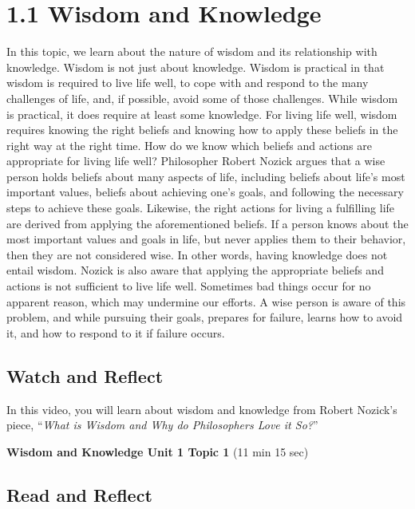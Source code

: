 \documentclass[
]{book}
\begin{document}
\hypertarget{wisdom-and-knowledge}{%
\section*{1.1 Wisdom and Knowledge}\label{wisdom-and-knowledge}}

In this topic, we learn about the nature of wisdom and its relationship with knowledge. Wisdom is not just about knowledge. Wisdom is practical in that wisdom is required to live life well, to cope with and respond to the many challenges of life, and, if possible, avoid some of those challenges. While wisdom is practical, it does require at least some knowledge. For living life well, wisdom requires knowing the right beliefs and knowing how to apply these beliefs in the right way at the right time. How do we know which beliefs and actions are appropriate for living life well? Philosopher Robert Nozick argues that a wise person holds beliefs about many aspects of life, including beliefs about life's most important values, beliefs about achieving one's goals, and following the necessary steps to achieve these goals. Likewise, the right actions for living a fulfilling life are derived from applying the aforementioned beliefs. If a person knows about the most important values and goals in life, but never applies them to their behavior, then they are not considered wise. In other words, having knowledge does not entail wisdom. Nozick is also aware that applying the appropriate beliefs and actions is not sufficient to live life well. Sometimes bad things occur for no apparent reason, which may undermine our efforts. A wise person is aware of this problem, and while pursuing their goals, prepares for failure, learns how to avoid it, and how to respond to it if failure occurs.

\hypertarget{watch-and-reflect}{%
\subsection*{Watch and Reflect}\label{watch-and-reflect}}

In this video, you will learn about wisdom and knowledge from Robert Nozick's piece, ``\emph{What is Wisdom and Why do Philosophers Love it So?}''

\textbf{Wisdom and Knowledge Unit 1 Topic 1} (11 min 15 sec)

\hypertarget{read-and-reflect}{%
\subsection*{Read and Reflect}\label{read-and-reflect}}
\end{document}

